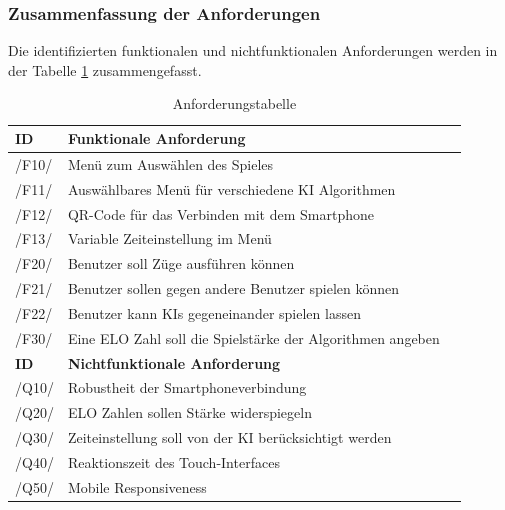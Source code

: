 \documentclass[12pt,a4paper,bibliography=totocnumbered,listof=totocnumbered]{article}
\begin{document}
\begin{appendix}
\subsubsection{Zusammenfassung der Anforderungen}
Die identifizierten funktionalen und nichtfunktionalen Anforderungen werden in der Tabelle \ref{tab:Anforderungen} zusammengefasst. 
\vspace{1em}
\begin{table}[!h]
	\centering
	\begin{tabular}{|l|l|l|}
		\hline
		\textbf{ID} & \textbf{Funktionale Anforderung}\\
		\hline
		/F10/ & Menü zum Auswählen des Spieles \\
		\hline
		/F11/ & Auswählbares Menü für verschiedene \ac{KI} Algorithmen \\
		\hline
        /F12/ & QR-Code für das Verbinden mit dem Smartphone \\
		\hline
		/F13/ & Variable Zeiteinstellung im Menü \\
        \hline
		/F20/ & Benutzer soll Züge ausführen können \\
        \hline
		/F21/ & Benutzer sollen gegen andere Benutzer spielen können \\
        \hline
		/F22/ & Benutzer kann \ac{KI}s gegeneinander spielen lassen \\
        \hline
		/F30/ & Eine ELO Zahl soll die Spielstärke der Algorithmen angeben \\
	
		\hline
		\textbf{ID} & \textbf{Nichtfunktionale Anforderung}\\
		\hline
		/Q10/ & Robustheit der Smartphoneverbindung \\
        \hline
		/Q20/ & ELO Zahlen sollen Stärke widerspiegeln \\
        \hline
		/Q30/ & Zeiteinstellung soll von der \ac{KI} berücksichtigt werden \\
        \hline
		/Q40/ & Reaktionszeit des Touch-Interfaces \\
        \hline
		/Q50/ & Mobile Responsiveness \\
		\hline
	\end{tabular}
	\caption{Anforderungstabelle}
	\label{tab:Anforderungen}
\end{table}

\pagebreak


\end{appendix}
\end{document}
